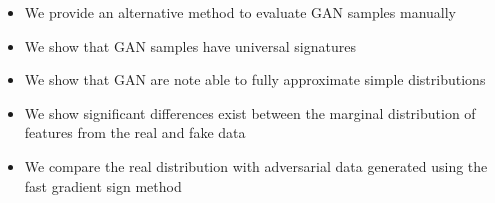 \begin{itemize}
\item We provide an alternative method to evaluate GAN samples manually
\item We show that GAN samples have universal signatures 
\item We show that GAN are note able to fully approximate simple distributions
\item We show significant differences exist between the marginal distribution of features from
    the real and fake data
\item We compare the real distribution with adversarial data generated using the fast
gradient sign method
\end{itemize}
